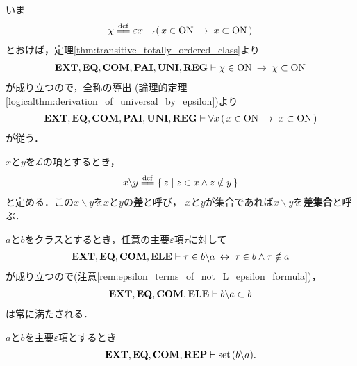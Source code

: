 	\begin{prf}
		いま
		\begin{align}
			\chi \defeq \varepsilon x \negation 
			(\, x \in \ON \rarrow x \subset \ON\, )
		\end{align}
		とおけば，定理\ref{thm:transitive_totally_ordered_class}より
		\begin{align}
			\mbox{{\bf EXT}},\mbox{{\bf EQ}},\mbox{\bf COM},\mbox{{\bf PAI}},\mbox{{\bf UNI}},\mbox{{\bf REG}} \vdash 
			\chi \in \mathrm{ON} \hspace{0.25em}\rightarrow\hspace{0.25em} \chi \subset \mathrm{ON}
		\end{align}
		が成り立つので，全称の導出
		(論理的定理\ref{logicalthm:derivation_of_universal_by_epsilon})より
		\begin{align}
			\mbox{{\bf EXT}},\mbox{{\bf EQ}},\mbox{\bf COM},\mbox{{\bf PAI}},\mbox{{\bf UNI}},\mbox{{\bf REG}} \vdash 
			\forall x\, (\, x \in \mathrm{ON} \hspace{0.25em}\rightarrow\hspace{0.25em} x \subset \mathrm{ON}\, )
		\end{align}
		が従う．
		\QED
	\end{prf}
	
	\begin{screen}
		\begin{dfn}[クラスの差]
			$x$と$y$を$\mathcal{L}$の項とするとき，
			\begin{align}
				x \backslash y \defeq \Set{z}{z \in x \wedge z \notin y}
			\end{align}
			と定める．この$x \backslash y$を$x$と$y$の{\bf 差}と呼び，
			$x$と$y$が集合であれば$x \backslash y$を{\bf 差集合}と呼ぶ．
		\end{dfn}
	\end{screen}
	
	$a$と$b$をクラスとするとき，任意の主要$\varepsilon$項$\tau$に対して
	\begin{align}
		\mbox{{\bf EXT}},\mbox{{\bf EQ}},\mbox{\bf COM},\mbox{{\bf ELE}} \vdash \tau \in b \backslash a \hspace{0.25em}\leftrightarrow\hspace{0.25em} \tau \in b \wedge \tau \notin a
	\end{align}
	が成り立つので(注意\ref{rem:epsilon_terms_of_not_L_epsilon_formula})，
	\begin{align}
		\mbox{{\bf EXT}},\mbox{{\bf EQ}},\mbox{\bf COM},\mbox{{\bf ELE}} \vdash b \backslash a \subset b
	\end{align}
	は常に満たされる．
	
	\begin{screen}
		\begin{thm}[差集合は集合]\label{thm:set_difference_is_set}
			$a$と$b$を主要$\varepsilon$項とするとき
			\begin{align}
				\mbox{{\bf EXT}},\mbox{{\bf EQ}},\mbox{\bf COM},\mbox{{\bf REP}} \vdash \operatorname*{set}\hspace{0.15em}(b \backslash a).
			\end{align}
		\end{thm}
	\end{screen}
	
